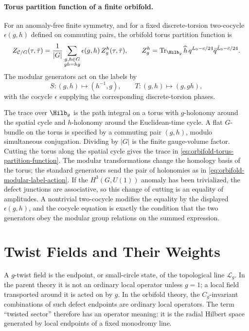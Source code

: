 \paragraph{Torus partition function of a finite orbifold.}
For an anomaly-free finite symmetry, and for a fixed discrete-torsion
two-cocycle \(\epsilon(g,h)\) defined on commuting pairs, the orbifold torus
partition function is
\begin{equation}
  Z_{\mathcal C/G}(\tau,\bar\tau)
  =
  \frac1{|G|}
  \sum_{\substack{g,h\in G\\ gh=hg}}
  \epsilon(g,h)\,
  Z_g^h(\tau,\bar\tau),
  \qquad
  Z_g^h
  =
  \operatorname{Tr}_{\Hilb_g}
  \widehat h\,
  q^{L_0-c/24}\bar q^{\bar L_0-\bar c/24}.
  \label{eq:orbifold-torus-partition-function}
\end{equation}
The modular generators act on the labels by
\begin{equation}
  S:(g,h)\mapsto(h^{-1},g),
  \qquad
  T:(g,h)\mapsto(g,gh),
  \label{eq:orbifold-modular-label-action}
\end{equation}
with the cocycle \(\epsilon\) supplying the corresponding discrete-torsion
phases.

The trace over \(\Hilb_g\) is the path integral on a torus with \(g\)-holonomy
around the spatial cycle and \(h\)-holonomy around the Euclidean-time cycle.
A flat \(G\)-bundle on the torus is specified by a commuting pair
\((g,h)\), modulo simultaneous conjugation.  Dividing by \(|G|\) is the
finite gauge-volume factor.  Cutting the torus along the spatial cycle gives
the trace in \eqref{eq:orbifold-torus-partition-function}.  The modular
transformations change the homology basis of the torus; the standard
generators send the pair of holonomies as in
\eqref{eq:orbifold-modular-label-action}.  If the \(H^3(G,U(1))\) anomaly has
been trivialized, the defect junctions are associative, so this change of
cutting is an equality of amplitudes.  A nontrivial two-cocycle modifies the
equality by the displayed \(\epsilon(g,h)\), and the cocycle equation is
exactly the condition that the two generators obey the modular group
relations on the summed expression.

\section{Twist Fields and Their Weights}
\label{sec:twist-fields-and-weights}

A \(g\)-twist field is the endpoint, or small-circle state, of the
topological line \(\mathcal L_g\).  In the parent theory it is not an ordinary
local operator unless \(g=1\); a local field transported around it is acted on
by \(g\).  In the orbifold theory, the \(C_g\)-invariant combinations of such
defect endpoints are ordinary local operators.  The term ``twisted sector''
therefore has an operator meaning: it is the radial Hilbert space generated
by local endpoints of a fixed monodromy line.

